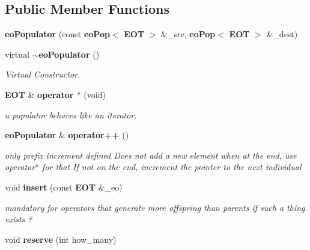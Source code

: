 \subsection*{Public Member Functions}
\begin{CompactItemize}
\item 
{\bf eo\-Populator} (const {\bf eo\-Pop}$<$ {\bf EOT} $>$ \&\_\-src, {\bf eo\-Pop}$<$ {\bf EOT} $>$ \&\_\-dest)\label{classeo_populator_a0}

\item 
virtual {\bf $\sim$eo\-Populator} ()\label{classeo_populator_a1}

\begin{CompactList}\small\item\em Virtual Constructor. \item\end{CompactList}\item 
{\bf EOT} \& {\bf operator $\ast$} (void)
\begin{CompactList}\small\item\em a populator behaves like an iterator. \item\end{CompactList}\item 
{\bf eo\-Populator} \& {\bf operator++} ()\label{classeo_populator_a3}

\begin{CompactList}\small\item\em only prefix increment defined Does not add a new element when at the end, use operator$\ast$ for that If not on the end, increment the pointer to the next individual \item\end{CompactList}\item 
void {\bf insert} (const {\bf EOT} \&\_\-eo)\label{classeo_populator_a4}

\begin{CompactList}\small\item\em mandatory for operators that generate more offspring than parents if such a thing exists ? \item\end{CompactList}\item 
void {\bf reserve} (int how\_\-many)\label{classeo_populator_a5}


\end{CompactItemize}

